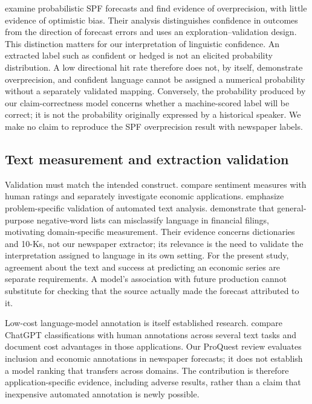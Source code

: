 \documentclass[iicol,pdflatex,sn-mathphys-num]{sn-jnl}
\begin{document}
\citet{campbell2024} examine probabilistic SPF forecasts and find evidence of overprecision, with little evidence of optimistic bias. Their analysis distinguishes confidence in outcomes from the direction of forecast errors and uses an exploration--validation design. This distinction matters for our interpretation of linguistic confidence. An extracted label such as confident or hedged is not an elicited probability distribution. A low directional hit rate therefore does not, by itself, demonstrate overprecision, and confident language cannot be assigned a numerical probability without a separately validated mapping. Conversely, the probability produced by our claim-correctness model concerns whether a machine-scored label will be correct; it is not the probability originally expressed by a historical speaker. We make no claim to reproduce the SPF overprecision result with newspaper labels.

\subsection{Text measurement and extraction validation}
Validation must match the intended construct. \citet{shapiro2020} compare sentiment measures with human ratings and separately investigate economic applications. \citet{grimmer2013} emphasize problem-specific validation of automated text analysis. \citet{loughran2011} demonstrate that general-purpose negative-word lists can misclassify language in financial filings, motivating domain-specific measurement. Their evidence concerns dictionaries and 10-Ks, not our newspaper extractor; its relevance is the need to validate the interpretation assigned to language in its own setting. For the present study, agreement about the text and success at predicting an economic series are separate requirements. A model's association with future production cannot substitute for checking that the source actually made the forecast attributed to it.

Low-cost language-model annotation is itself established research. \citet{gilardi2023} compare ChatGPT classifications with human annotations across several text tasks and document cost advantages in those applications. Our ProQuest review evaluates inclusion and economic annotations in newspaper forecasts; it does not establish a model ranking that transfers across domains. The contribution is therefore application-specific evidence, including adverse results, rather than a claim that inexpensive automated annotation is newly possible.
\end{document}
